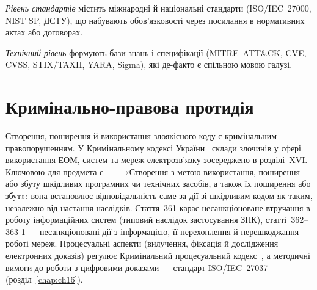 \emph{Рівень стандартів} містить міжнародні й національні стандарти (ISO/IEC~27000, NIST SP, ДСТУ), що набувають обов'язковості через посилання в нормативних актах або договорах.

\emph{Технічний рівень} формують бази знань і специфікації (MITRE~ATT\&CK, CVE, CVSS, STIX/TAXII, YARA, Sigma), які де-факто є спільною мовою галузі.

\begin{tikzfig}
\end{tikzfig}

\section{Кримінально-правова протидія}\label{sec:ch02-criminal}

Створення, поширення й використання злоякісного коду є кримінальним правопорушенням. У Кримінальному кодексі України~\cite{kk-ukr} склади злочинів у сфері використання ЕОМ, систем та мереж електрозв'язку зосереджено в розділі~XVI. Ключовою для предмета є ~\cite{kk-ukr} --- «Створення з метою використання, поширення або збуту шкідливих програмних чи технічних засобів, а також їх поширення або збут»: вона встановлює відповідальність саме за дії зі шкідливим кодом як таким, незалежно від настання наслідків. Стаття~361 карає несанкціоноване втручання в роботу інформаційних систем (типовий наслідок застосування ЗПК), статті~362--363-1 --- несанкціоновані дії з інформацією, її перехоплення й перешкоджання роботі мереж. Процесуальні аспекти (вилучення, фіксація й дослідження електронних доказів) регулює Кримінальний процесуальний кодекс~\cite{ch02:kpk}, а методичні вимоги до роботи з цифровими доказами --- стандарт ISO/IEC~27037~\cite{iso-27037} (розділ~\ref{chap:ch16}).

